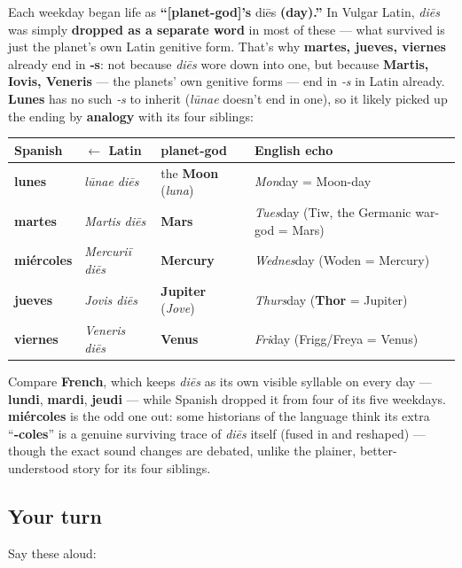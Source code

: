 \begin{cousinweb}
Each weekday began life as \textbf{\textquotedblleft{}{[}planet-god{]}'s }diēs\textbf{ (day).\textquotedblright{}} In Vulgar Latin, \emph{diēs} was simply \textbf{dropped as a separate word} in most of these — what survived is just the planet's own Latin genitive form. That's why \textbf{martes, jueves, viernes} already end in \textbf{‑s}: not because \emph{diēs} wore down into one, but because \textbf{Martis, Iovis, Veneris} — the planets' own genitive forms — end in \emph{‑s} in Latin already. \textbf{Lunes} has no such \emph{‑s} to inherit (\emph{lūnae} doesn't end in one), so it likely picked up the ending by \textbf{analogy} with its four siblings:

\noindent
\begin{tabularx}{\linewidth}{@{}>{\raggedright\arraybackslash}X>{\raggedright\arraybackslash}X>{\raggedright\arraybackslash}X>{\raggedright\arraybackslash}X@{}}
\toprule
\textbf{Spanish} & \textbf{$\leftarrow$ Latin} & \textbf{planet-god} & \textbf{English echo} \\
\midrule
\textbf{lunes} & \emph{lūnae diēs} & the \textbf{Moon} (\emph{luna}) & \emph{Mon}day = Moon-day \\
\textbf{martes} & \emph{Martis diēs} & \textbf{Mars} & \emph{Tues}day (Tiw, the Germanic war-god = Mars) \\
\textbf{miércoles} & \emph{Mercuriī diēs} & \textbf{Mercury} & \emph{Wednes}day (Woden = Mercury) \\
\textbf{jueves} & \emph{Jovis diēs} & \textbf{Jupiter} (\emph{Jove}) & \emph{Thurs}day (\textbf{Thor} = Jupiter) \\
\textbf{viernes} & \emph{Veneris diēs} & \textbf{Venus} & \emph{Fri}day (Frigg/Freya = Venus) \\
\bottomrule
\end{tabularx}

Compare \textbf{French}, which keeps \emph{diēs} as its own visible syllable on every day — \textbf{lundi}, \textbf{mardi}, \textbf{jeudi} — while Spanish dropped it from four of its five weekdays. \textbf{miércoles} is the odd one out: some historians of the language think its extra \textquotedblleft{}\textbf{‑coles}\textquotedblright{} is a genuine surviving trace of \emph{diēs} itself (fused in and reshaped) — though the exact sound changes are debated, unlike the plainer, better-understood story for its four siblings.
\end{cousinweb}

\subsection*{Your turn}
Say these aloud:

